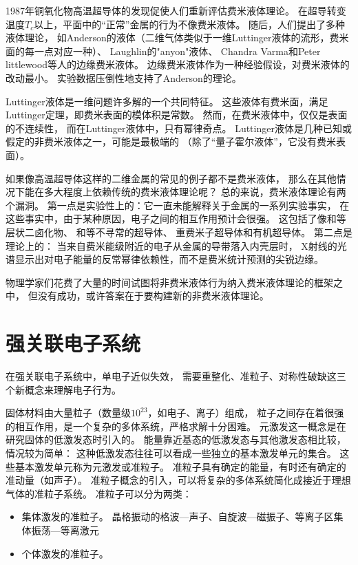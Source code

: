 \documentclass{article}
\begin{document}
1987年铜氧化物高温超导体的发现促使人们重新评估费米液体理论。
在超导转变温度$T_c$以上，平面中的“正常”金属的行为不像费米液体。
随后，人们提出了多种液体理论，
如Anderson的液体（二维气体类似于一维Luttinger液体的流形，费米面的每一点对应一种）、
Laughlin的"anyon"液体、
Chandra Varma和Peter littlewood等人的边缘费米液体。
边缘费米液体作为一种经验假设，对费米液体的改动最小。
实验数据压倒性地支持了Anderson的理论。

Luttinger液体是一维问题许多解的一个共同特征。
这些液体有费米面，满足Luttinger定理，即费米表面的模体积是常数。
然而，在费米液体中，仅仅是表面的不连续性，
而在Luttinger液体中，只有幂律奇点。
Luttinger液体是几种已知或假定的非费米液体之一，可能是最极端的
（除了“量子霍尔液体”，它没有费米表面）。

如果像高温超导体这样的二维金属的常见的例子都不是费米液体，
那么在其他情况下能在多大程度上依赖传统的费米液体理论呢？
总的来说，费米液体理论有两个漏洞。
第一点是实验性上的：它一直未能解释关于金属的一系列实验事实，
在这些事实中，由于某种原因，电子之间的相互作用预计会很强。
这包括了像和等层状二卤化物、
和等不寻常的超导体、
重费米子超导体和有机超导体。
第二点是理论上的：
当来自费米能级附近的电子从金属的导带落入内壳层时，
X射线的光谱显示出对电子能量的反常幂律依赖性，而不是费米统计预测的尖锐边缘。 

物理学家们花费了大量的时间试图将非费米液体行为纳入费米液体理论的框架之中，
但没有成功，或许答案在于要构建新的非费米液体理论。

\section{强关联电子系统}
在强关联电子系统中，单电子近似失效，
需要重整化、准粒子、对称性破缺这三个新概念来理解电子行为。


固体材料由大量粒子（数量级$10^{23}$，如电子、离子）组成，
粒子之间存在着很强的相互作用，是一个复杂的多体系统，严格求解十分困难。
元激发这一概念是在研究固体的低激发态时引入的。
能量靠近基态的低激发态与其他激发态相比较，情况较为简单：
这种低激发态往往可以看成一些独立的基本激发单元的集合。
这些基本激发单元称为元激发或准粒子。
准粒子具有确定的能量，有时还有确定的准动量（如声子）。
准粒子概念的引入，可以将复杂的多体系统简化成接近于理想气体的准粒子系统。
准粒子可以分为两类：
\begin{itemize}
    \item 集体激发的准粒子。
    晶格振动的格波---声子、自旋波---磁振子、等离子区集体振荡---等离激元
    \item 个体激发的准粒子。
\end{itemize}
\end{document}
